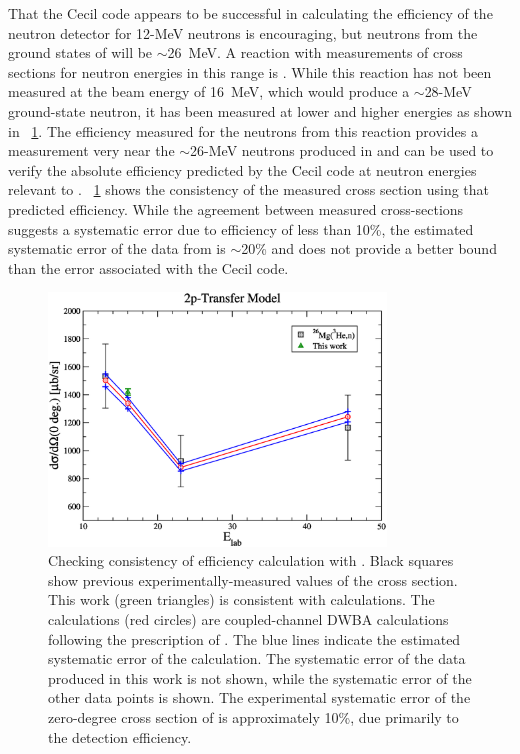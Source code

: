 That the Cecil code appears to be successful in calculating the efficiency of the neutron detector for 12-MeV neutrons is encouraging, but neutrons from the ground states of \reaction will be $\sim$26~MeV.  A reaction with measurements of cross sections for neutron energies in this range is \MgReaction.  While this reaction has not been measured at the beam energy of 16~MeV, which would produce a $\sim$28-MeV ground-state neutron, it has been measured at lower and higher energies \citep{MgCrossSection1,Bohne_Mg} as shown in {\fig}~\ref{fig:efficiencyCalib}.  The efficiency measured for the neutrons from this reaction provides a measurement very near the $\sim$26-MeV neutrons produced in \reaction and can be used to verify the absolute efficiency predicted by the Cecil code at neutron energies relevant to \reaction.  {\fig}~\ref{fig:efficiencyCalib} shows the consistency of the measured cross section using that predicted efficiency.  While the agreement between measured cross-sections suggests a systematic error due to efficiency of less than 10\%, the estimated systematic error of the data from \MgReaction is $\sim$20\% \citep{MgCrossSection1,Bohne_Mg} and does not provide a better bound than the error associated with the Cecil code.
\begin{figure}[!htbp]
\centering
\includegraphics[width=0.8\textwidth]{figures/magnesiumMatch.eps}
\caption[Checking consistency of efficiency calculation with \MgReaction by comparing to nearby measured cross sections.]{Checking consistency of efficiency calculation with \MgReaction.  Black squares show previous experimentally-measured values of the cross section.  This work (green triangles) is consistent with calculations.  The calculations (red circles) are coupled-channel DWBA calculations following the prescription of \citep{MgCrossSection1}.  The blue lines indicate the estimated systematic error of the calculation.  The systematic error of the data produced in this work is not shown, while the systematic error of the other data points is shown.  The experimental systematic error of the zero-degree cross section of \MgReaction is approximately 10\%, due primarily to the detection efficiency.}
\label{fig:efficiencyCalib}
\end{figure}

